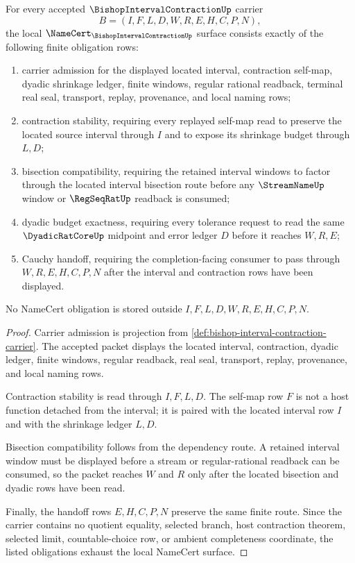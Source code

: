\begin{theorem}
\label{thm:bishop-interval-contraction-namecert-obligations}
For every accepted $\BishopIntervalContractionUp$ carrier
$$
B=(I,F,L,D,W,R,E,H,C,P,N),
$$
the local $\NameCert_{\BishopIntervalContractionUp}$ surface consists exactly of the following finite obligation rows:
\begin{enumerate}
\item carrier admission for the displayed located interval, contraction self-map, dyadic shrinkage ledger, finite windows, regular rational readback, terminal real seal, transport, replay, provenance, and local naming rows;
\item contraction stability, requiring every replayed self-map read to preserve the located source interval through $I$ and to expose its shrinkage budget through $L,D$;
\item bisection compatibility, requiring the retained interval windows to factor through the located interval bisection route before any $\StreamNameUp$ window or $\RegSeqRatUp$ readback is consumed;
\item dyadic budget exactness, requiring every tolerance request to read the same $\DyadicRatCoreUp$ midpoint and error ledger $D$ before it reaches $W,R,E$;
\item Cauchy handoff, requiring the completion-facing consumer to pass through $W,R,E,H,C,P,N$ after the interval and contraction rows have been displayed.
\end{enumerate}
No NameCert obligation is stored outside $I,F,L,D,W,R,E,H,C,P,N$.
\end{theorem}
\begin{proof}
Carrier admission is projection from \autoref{def:bishop-interval-contraction-carrier}. The accepted packet displays the located interval, contraction, dyadic ledger, finite windows, regular readback, real seal, transport, replay, provenance, and local naming rows.

Contraction stability is read through $I,F,L,D$. The self-map row $F$ is not a host function detached from the interval; it is paired with the located interval row $I$ and with the shrinkage ledger $L,D$.

Bisection compatibility follows from the dependency route. A retained interval window must be displayed before a stream or regular-rational readback can be consumed, so the packet reaches $W$ and $R$ only after the located bisection and dyadic rows have been read.

Finally, the handoff rows $E,H,C,P,N$ preserve the same finite route. Since the carrier contains no quotient equality, selected branch, host contraction theorem, selected limit, countable-choice row, or ambient completeness coordinate, the listed obligations exhaust the local NameCert surface.
\end{proof}

